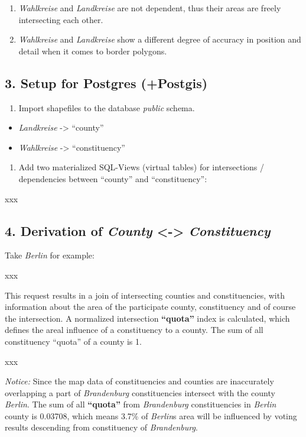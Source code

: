 \begin{enumerate}
\def\labelenumi{\arabic{enumi}.}
\itemsep1pt\parskip0pt
\item
  \emph{Wahlkreise} and \emph{Landkreise} are not dependent, thus their
  areas are freely intersecting each other.
\item
  \emph{Wahlkreise} and \emph{Landkreise} show a different degree of
  accuracy in position and detail when it comes to border polygons.
\end{enumerate}

\subsection{3. Setup for Postgres
(+Postgis)}\label{setup-for-postgres-postgis}

\begin{enumerate}
\def\labelenumi{\arabic{enumi}.}
\itemsep1pt\parskip0pt
\item
  Import shapefiles to the database \emph{public} schema.
\end{enumerate}

\begin{itemize}
\itemsep1pt\parskip0pt
\item
  \emph{Landkreise} -\textgreater{} ``county''
\item
  \emph{Wahlkreise} -\textgreater{} ``constituency''
\end{itemize}

\begin{enumerate}
\def\labelenumi{\arabic{enumi}.}
\setcounter{enumi}{1}
\itemsep1pt\parskip0pt
\item
  Add two materialized SQL-Views (virtual tables) for intersections /
  dependencies between ``county'' and ``constituency'':
\end{enumerate}

xxx

\subsection{4. Derivation of \emph{County} \textless{}-\textgreater{}
\emph{Constituency}}\label{derivation-of-county---constituency}

Take \emph{Berlin} for example:

xxx

This request results in a join of intersecting counties and
constituencies, with information about the area of the participate
county, constituency and of course the intersection. A normalized
intersection \textbf{``quota''} index is calculated, which defines the
areal influence of a constituency to a county. The sum of all
constituency ``quota'' of a county is 1.

xxx

\emph{Notice:} Since the map data of constituencies and counties are
inaccurately overlapping a part of \emph{Brandenburg} constituencies
intersect with the county \emph{Berlin}. The sum of all
\textbf{``quota''} from \emph{Brandenburg} constituencies in
\emph{Berlin} county is 0.03708, which means 3.7\% of \emph{Berlin}s
area will be influenced by voting results descending from constituency
of \emph{Brandenburg}.

